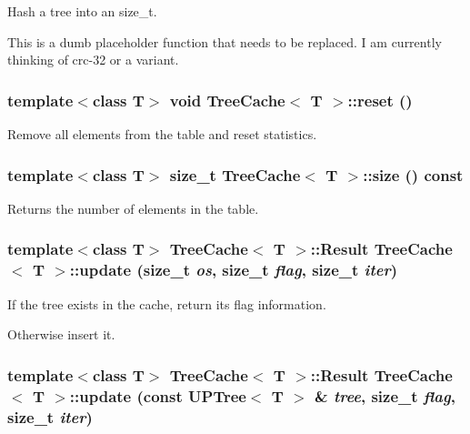 Hash a tree into an size\_\-t. 

This is a dumb placeholder function that needs to be replaced. I am currently thinking of crc-32 or a variant. 
\subsubsection{\setlength{\rightskip}{0pt plus 5cm}template$<$class T$>$ void {\bf Tree\-Cache}$<$ T $>$::reset ()}\label{classTreeCache_a2}


Remove all elements from the table and reset statistics. 

\subsubsection{\setlength{\rightskip}{0pt plus 5cm}template$<$class T$>$ size\_\-t {\bf Tree\-Cache}$<$ T $>$::size () const\hspace{0.3cm}{\tt  [inline]}}\label{classTreeCache_a3}


Returns the number of elements in the table. 

\subsubsection{\setlength{\rightskip}{0pt plus 5cm}template$<$class T$>$ {\bf Tree\-Cache}$<$ T $>$::{\bf Result} {\bf Tree\-Cache}$<$ T $>$::update (size\_\-t {\em os}, size\_\-t {\em flag}, size\_\-t {\em iter})}\label{classTreeCache_a5}


If the tree exists in the cache, return its flag information. 

Otherwise insert it. 
\subsubsection{\setlength{\rightskip}{0pt plus 5cm}template$<$class T$>$ {\bf Tree\-Cache}$<$ T $>$::{\bf Result} {\bf Tree\-Cache}$<$ T $>$::update (const {\bf UPTree}$<$ T $>$ \& {\em tree}, size\_\-t {\em flag}, size\_\-t {\em iter})\hspace{0.3cm}{\tt  [inline]}}\label{classTreeCache_a4}


